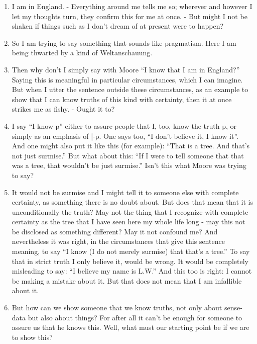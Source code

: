 \documentclass{book}
\begin{document}
\begin{enumerate}
\item
I am in England. - Everything around me tells me so; wherever and however I let
my thoughts turn, they confirm this for me at once. - But might I not be shaken
if things such as I don't dream of at present were to happen?

\item
So I am trying to say something that sounds like pragmatism.  Here I am being
thwarted by a kind of Weltanschauung.

\item
Then why don't I simply say with Moore ``I know that I am in England?'' Saying
this is meaningful in particular circumstances, which I can imagine. But when I
utter the sentence outside these circumstances, as an example to show that I
can know truths of this kind with certainty, then it at once strikes me as
fishy. - Ought it to?

\item
I say ``I know p'' either to assure people that I, too, know the truth p, or
simply as an emphasis of |-p. One says too, ``I don't believe it, I know it''.
And one might also put it like this (for example): ``That is a tree. And that's
not just surmise.'' But what about this: ``If I were to tell someone that that
was a tree, that wouldn't be just surmise.'' Isn't this what Moore was trying
to say?

\item
It would not be surmise and I might tell it to someone else with complete
certainty, as something there is no doubt about. But does that mean that it is
unconditionally the truth? May not the thing that I recognize with complete
certainty as the tree that I have seen here my whole life long - may this not
be disclosed as something different? May it not confound me?  And nevertheless
it was right, in the circumstances that give this sentence meaning, to say ``I
know (I do not merely surmise) that that's a tree.'' To say that in strict
truth I only believe it, would be wrong. It would be completely misleading to
say: ``I believe my name is L.W.'' And this too is right: I cannot be making a
mistake about it. But that does not mean that I am infallible about it.

\item
But how can we show someone that we know truths, not only about sense-data but
also about things? For after all it can't be enough for someone to assure us
that he knows this.  Well, what must our starting point be if we are to show
this?


\end{enumerate}
\end{document}
